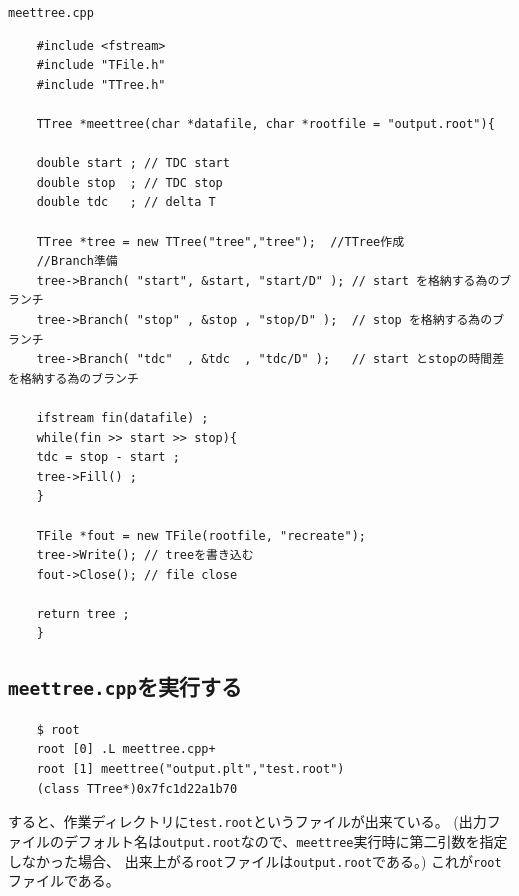 \documentclass{jarticle}
\begin{document}
 \begin{itembox}{\texttt{meettree.cpp}}
\begin{verbatim}
	#include <fstream>
	#include "TFile.h"
	#include "TTree.h"

	TTree *meettree(char *datafile, char *rootfile = "output.root"){

	double start ; // TDC start
	double stop  ; // TDC stop
	double tdc   ; // delta T

	TTree *tree = new TTree("tree","tree");  //TTree作成
	//Branch準備
	tree->Branch( "start", &start, "start/D" ); // start を格納する為のブランチ
	tree->Branch( "stop" , &stop , "stop/D" );  // stop を格納する為のブランチ
	tree->Branch( "tdc"  , &tdc  , "tdc/D" );   // start とstopの時間差 を格納する為のブランチ

	ifstream fin(datafile) ;
	while(fin >> start >> stop){
	tdc = stop - start ;
	tree->Fill() ;
	}

	TFile *fout = new TFile(rootfile, "recreate");
	tree->Write(); // treeを書き込む
	fout->Close(); // file close

	return tree ;
	}
\end{verbatim}
 \end{itembox}

  \subsection{\texttt{meettree.cpp}を実行する}
\begin{verbatim}
	$ root
	root [0] .L meettree.cpp+
	root [1] meettree("output.plt","test.root")
	(class TTree*)0x7fc1d22a1b70
\end{verbatim}
すると、作業ディレクトリに\verb|test.root|というファイルが出来ている。
(出力ファイルのデフォルト名は\verb|output.root|なので、\verb|meettree|実行時に第二引数を指定しなかった場合、
出来上がる\verb|root|ファイルは\verb|output.root|である。)
これが\verb|root|ファイルである。
\end{document}
